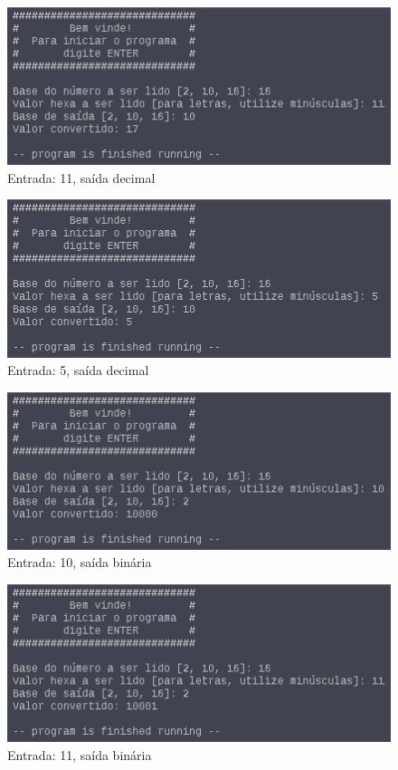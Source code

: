 \documentclass{article}
\begin{document}
\begin{figure}[H]
  \includegraphics[width=\linewidth]{./CasoHexa2}
  \caption{Entrada: 11, saída decimal}
  \label{fig:hexa2}
\end{figure}

\begin{figure}[H]
  \includegraphics[width=\linewidth]{./CasoHexa3}
  \caption{Entrada: 5, saída decimal}
  \label{fig:hexa3}
\end{figure}

\begin{figure}[H]
  \includegraphics[width=\linewidth]{./CasoHexa4}
  \caption{Entrada: 10, saída binária}
  \label{fig:hexa5}
\end{figure}

\begin{figure}[H]
  \includegraphics[width=\linewidth]{./CasoHexa5}
  \caption{Entrada: 11, saída binária}
  \label{fig:hexa5}
\end{figure}
\end{document}
